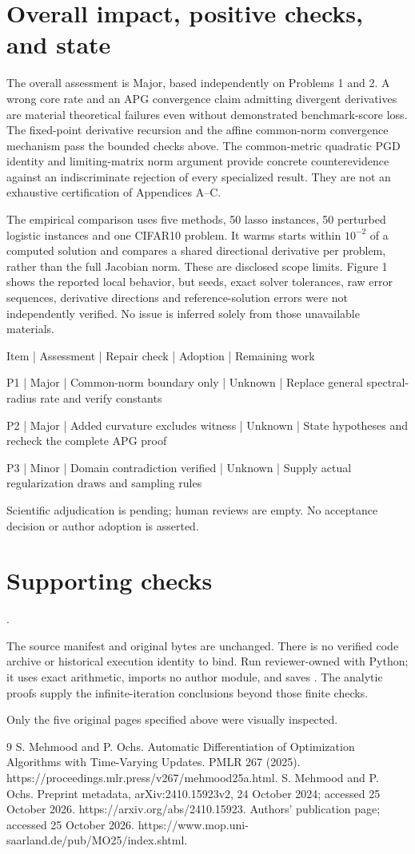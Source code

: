 \documentclass[10pt]{article}
\begin{document}
\section*{Overall impact, positive checks, and state}
The overall assessment is Major, based independently on Problems 1 and 2. A wrong core rate and an APG convergence claim admitting divergent derivatives are material theoretical failures even without demonstrated benchmark-score loss. The fixed-point derivative recursion and the affine common-norm convergence mechanism pass the bounded checks above. The common-metric quadratic PGD identity and limiting-matrix norm argument provide concrete counterevidence against an indiscriminate rejection of every specialized result. They are not an exhaustive certification of Appendices A–C.\par
The empirical comparison uses five methods, 50 lasso instances, 50 perturbed logistic instances and one CIFAR10 problem. It warms starts within \(10^{-2}\) of a computed solution and compares a shared directional derivative per problem, rather than the full Jacobian norm. These are disclosed scope limits. Figure 1 shows the reported local behavior, but seeds, exact solver tolerances, raw error sequences, derivative directions and reference-solution errors were not independently verified. No issue is inferred solely from those unavailable materials.\par
Item | Assessment | Repair check | Adoption | Remaining work\par
P1 | Major | Common-norm boundary only | Unknown | Replace general spectral-radius rate and verify constants\par
P2 | Major | Added curvature excludes witness | Unknown | State hypotheses and recheck the complete APG proof\par
P3 | Minor | Domain contradiction verified | Unknown | Supply actual regularization draws and sampling rules\par
Scientific adjudication is pending; human reviews are empty. No acceptance decision or author adoption is asserted.\par
\section*{Supporting checks}
.\par
The source manifest and original bytes are unchanged. There is no verified code archive or historical execution identity to bind. Run reviewer-owned with Python; it uses exact arithmetic, imports no author module, and saves . The analytic proofs supply the infinite-iteration conclusions beyond those finite checks.\par
Only the five original pages specified above were visually inspected.\par
9 S. Mehmood and P. Ochs. Automatic Differentiation of Optimization Algorithms with Time-Varying Updates. PMLR 267 (2025). https://proceedings.mlr.press/v267/mehmood25a.html. S. Mehmood and P. Ochs. Preprint metadata, arXiv:2410.15923v2, 24 October 2024; accessed 25 October 2026. https://arxiv.org/abs/2410.15923. Authors’ publication page; accessed 25 October 2026. https://www.mop.uni-saarland.de/pub/MO25/index.shtml.\par
\end{document}
